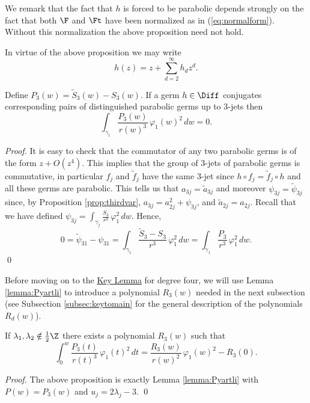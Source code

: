 We remark that the fact that $h$ is forced to be parabolic depends strongly on the fact that both $\F$ and $\Ft$ have been normalized as in (\ref{eq:normalform}). Without this normalization the above proposition need not hold.

In virtue of the above proposition we may write
\[ h(z)=z+\sum_{d=2}^{\infty}h_dz^d. \]


\begin{proposition}\label{prop:key3}
Define $P_3(w)=\widetilde{S}_3(w)-S_3(w)$. If a germ $h\in\Diff$ conjugates corresponding pairs of distinguished parabolic germs up to $3$-jets then
\[ \int_{\gamma_1}\frac{P_3(w)}{r(w)^3}\,\varphi_1(w)^2\,dw=0. \]
\end{proposition}

\begin{proof}
It is easy to check that the commutator of any two parabolic germs is of the form $z+O(z^4)$. This implies that the group of 3-jets of parabolic germs is commutative, in particular $f_j$ and $\tilde{f}_j$ have the same 3-jet since $h\circ f_j=\tilde{f}_j\circ h$ and all these germs are parabolic. This tells us that $a_{3j}=\tilde{a}_{3j}$ and moreover $\psi_{3j}=\widetilde{\psi}_{3j}$ since, by Proposition \ref{prop:thirdvar},  $a_{3j}=a_{2j}^2+\psi_{3j}$, and $\tilde{a}_{2j}=a_{2j}$. Recall that we have defined $\psi_{3j}=\int_{\gamma_j}\frac{S_3}{r^3}\,\varphi_1^2\,dw$. Hence,
\[0=\widetilde{\psi}_{31}-\psi_{31}=\int_{\gamma_1}\frac{\widetilde{S}_3-S_3}{r^3}\,\varphi_1^2\,dw=\int_{\gamma_1}\frac{P_3}{r^3}\,\varphi_1^2\,dw. \]
\qed\end{proof}

Before moving on to the \hyperref[lemma:key]{Key Lemma} for degree four, we will use Lemma \ref{lemma:Pyartli} to introduce a polynomial $R_3(w)$ needed in the next subsection (see Subsection \ref{subsec:keytomain} for the general description of the polynomials $R_d(w)$).

\begin{proposition}\label{prop:R3}
If $\lambda_1,\lambda_2\notin\frac{1}{2}\Z$ there exists a polynomial $R_3(w)$ such that 
\[ \int_0^w\frac{P_3(t)}{r(t)^3}\,\varphi_1(t)^2\,dt=\frac{R_3(w)}{r(w)^2}\,\varphi_1(w)^2-R_3(0). \]
\end{proposition}

\begin{proof}
The above proposition is exactly Lemma \ref{lemma:Pyartli} with $P(w)=P_3(w)$ and $u_j=2\lambda_j-3$.
\qed\end{proof}









